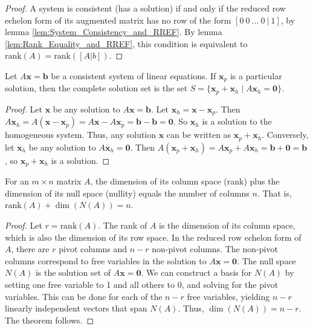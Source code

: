 \begin{proof}
    A system is consistent (has a solution) if and only if the reduced row echelon form of its augmented matrix has no row of the form $[0 \ 0 \ \dots \ 0 \ | \ 1]$, by lemma \ref{lem:System_Consistency_and_RREF}. By lemma \ref{lem:Rank_Equality_and_RREF}, this condition is equivalent to $\text{rank}(A) = \text{rank}([A|b])$.
\end{proof}

\begin{lemma}
    \label{lem:General_Solution_Structure}
    Let $A\mathbf{x}=\mathbf{b}$ be a consistent system of linear equations. If $\mathbf{x}_p$ is a particular solution, then the complete solution set is the set $S = \{ \mathbf{x}_p + \mathbf{x}_h \mid A\mathbf{x}_h = \mathbf{0} \}$.
\end{lemma}

\begin{proof}
    Let $\mathbf{x}$ be any solution to $A\mathbf{x}=\mathbf{b}$. Let $\mathbf{x}_h = \mathbf{x} - \mathbf{x}_p$. Then $A\mathbf{x}_h = A(\mathbf{x} - \mathbf{x}_p) = A\mathbf{x} - A\mathbf{x}_p = \mathbf{b} - \mathbf{b} = \mathbf{0}$. So $\mathbf{x}_h$ is a solution to the homogeneous system. Thus, any solution $\mathbf{x}$ can be written as $\mathbf{x}_p + \mathbf{x}_h$. Conversely, let $\mathbf{x}_h$ be any solution to $A\mathbf{x}_h = \mathbf{0}$. Then $A(\mathbf{x}_p + \mathbf{x}_h) = A\mathbf{x}_p + A\mathbf{x}_h = \mathbf{b} + \mathbf{0} = \mathbf{b}$, so $\mathbf{x}_p + \mathbf{x}_h$ is a solution.
\end{proof}

\begin{lemma}
    \label{lem:Rank_Nullity_Theorem}
    For an $m \times n$ matrix $A$, the dimension of its column space (rank) plus the dimension of its null space (nullity) equals the number of columns $n$. That is, $\text{rank}(A) + \dim(N(A)) = n$.
\end{lemma}

\begin{proof}
    Let $r = \text{rank}(A)$. The rank of $A$ is the dimension of its column space, which is also the dimension of its row space. In the reduced row echelon form of $A$, there are $r$ pivot columns and $n-r$ non-pivot columns. The non-pivot columns correspond to free variables in the solution to $A\mathbf{x}=\mathbf{0}$. The null space $N(A)$ is the solution set of $A\mathbf{x}=\mathbf{0}$. We can construct a basis for $N(A)$ by setting one free variable to 1 and all others to 0, and solving for the pivot variables. This can be done for each of the $n-r$ free variables, yielding $n-r$ linearly independent vectors that span $N(A)$. Thus, $\dim(N(A)) = n-r$. The theorem follows.
\end{proof}

